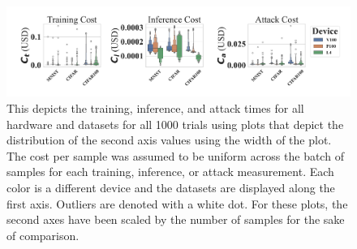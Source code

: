 \documentclass[sn-mathphys-num]{sn-jnl}%
\begin{document}
\begin{figure}[h]
    \centering
    \includegraphics[width=\textwidth]{plots/combined/cost.pdf}
    \caption{This depicts the training, inference, and attack times for all hardware and datasets for all 1000 trials using plots that depict the distribution of the second axis values using the width of the plot. The cost per sample was assumed to be uniform across the batch of samples for each training, inference, or attack measurement.   
    Each color is a different device and the datasets are displayed along the first axis. Outliers are denoted with a white dot. For these plots, the second axes have been scaled by the number of samples for the sake of comparison.} 
    \label{fig:cost}
\end{figure}
\end{document}
